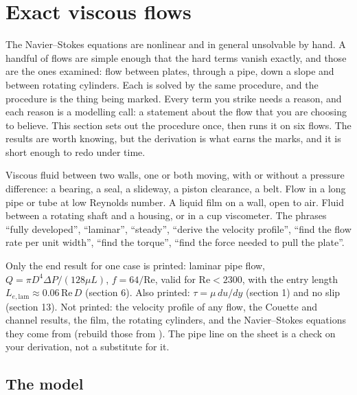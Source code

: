 \section{Exact viscous flows}
\label{sec:exactflows}

The Navier--Stokes equations are nonlinear and in general unsolvable by hand. A handful of flows are simple enough that the hard terms vanish exactly, and those are the ones examined: flow between plates, through a pipe, down a slope and between rotating cylinders. Each is solved by the same procedure, and the procedure is the thing being marked. Every term you strike needs a reason, and each reason is a modelling call: a statement about the flow that you are choosing to believe. This section sets out the procedure once, then runs it on six flows. The results are worth knowing, but the derivation is what earns the marks, and it is short enough to redo under time.

\begin{recognise}
Viscous fluid between two walls, one or both moving, with or without a pressure difference: a bearing, a seal, a slideway, a piston clearance, a belt. Flow in a long pipe or tube at low Reynolds number. A liquid film on a wall, open to air. Fluid between a rotating shaft and a housing, or in a cup viscometer. The phrases ``fully developed'', ``laminar'', ``steady'', ``derive the velocity profile'', ``find the flow rate per unit width'', ``find the torque'', ``find the force needed to pull the plate''.
\end{recognise}

\begin{onsheet}
Only the end result for one case is printed: laminar pipe flow, $Q = \pi D^4\Delta P/(128\mu L)$, $f = 64/\text{Re}$, valid for $\text{Re} < 2300$, with the entry length $L_{e,\text{lam}} \approx 0.06\,\text{Re}\,D$ (section 6). Also printed: $\tau = \mu\,du/dy$ (section 1) and no slip (section 13). Not printed: the velocity profile of any flow, the Couette and channel results, the film, the rotating cylinders, and the Navier--Stokes equations they come from (rebuild those from ). The pipe line on the sheet is a check on your derivation, not a substitute for it.
\end{onsheet}

\subsection*{The model}

